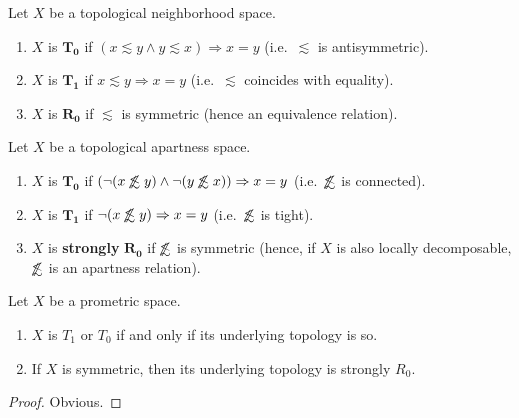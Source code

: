 \documentclass{article}
\def\apart{\mathrel{\#}}
\def\oapt{\mathrel{\!\not\,\not\lesssim}}
\def\leapx{\lesssim}
\let\implies\Rightarrow
\begin{document}
\begin{defn}
  Let $X$ be a topological neighborhood space.
  \begin{enumerate}
  \item $X$ is $\mathbf{T_0}$ if $(x\leapx y \land y\leapx x) \implies x=y$ (i.e.\ $\leapx$ is antisymmetric).
  \item $X$ is $\mathbf{T_1}$ if $x\leapx y \implies x=y$ (i.e.\ $\leapx$ coincides with equality).
  \item $X$ is $\mathbf{R_0}$ if $\leapx$ is symmetric (hence an equivalence relation).
  \end{enumerate}
  Let $X$ be a topological apartness space.
  \begin{enumerate}
  \item $X$ is $\mathbf{T_0}$ if $(\neg(x\oapt y) \land \neg(y\oapt x)) \implies x=y$ (i.e.\ $\oapt$ is connected).
  \item $X$ is $\mathbf{T_1}$ if $\neg(x\oapt y)\implies x=y$ (i.e.\ $\oapt$ is tight).
  \item $X$ is \textbf{strongly} $\mathbf{R_0}$ if $\oapt$ is symmetric (hence, if $X$ is also locally decomposable, $\oapt$ is an apartness relation).
  \end{enumerate}
\end{defn}

\begin{thm}
  Let $X$ be a prometric space.
  \begin{enumerate}
  \item $X$ is $T_1$ or $T_0$ if and only if its underlying topology is so.
  \item If $X$ is symmetric, then its underlying topology is strongly $R_0$.
  \end{enumerate}
\end{thm}
\begin{proof}
  Obvious.
\end{proof}
\end{document}
